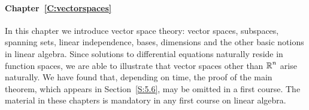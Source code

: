 \documentclass{ximera}
\begin{document}
\paragraph{Chapter~\ref{C:vectorspaces}} In this chapter we introduce vector 
space theory: vector spaces, subspaces, spanning sets, linear independence, 
bases, dimensions and the other basic notions in linear algebra.  Since 
solutions to differential equations naturally reside in function spaces, we 
are able to illustrate that vector spaces other than $\mbox{$\Bbb{R}$}^n$ arise naturally.  
We have found that, depending on time, the proof of the main theorem, which 
appears in Section~\ref{S:5.6}, may be omitted in a first course.  The 
material in these chapters is mandatory in any first course on linear algebra.




\end{document}
